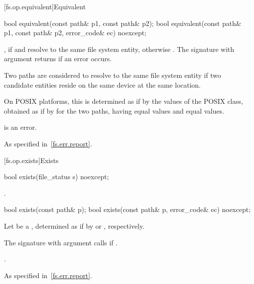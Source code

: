 [fs.op.equivalent]{Equivalent}

%
\begin{itemdecl}
bool equivalent(const path& p1, const path& p2);
bool equivalent(const path& p1, const path& p2, error_code& ec) noexcept;
\end{itemdecl}

\begin{itemdescr}
\pnum
\returns
{}, if  and  resolve to the same file
  system entity, otherwise . The signature with argument 
  returns  if an error occurs.

\pnum
Two paths are considered to resolve to the same file system entity if two
  candidate entities reside on the same device at the same location.
  \begin{note}
  On POSIX platforms, this is
  determined as if by the values of the POSIX  class,
  obtained as if by  for the two paths, having equal  values
  and equal  values.
  \end{note}

\pnum
\remarks
{} is an error.

\pnum
\throws
As specified in~\ref{fs.err.report}.
\end{itemdescr}


[fs.op.exists]{Exists}

%
\begin{itemdecl}
bool exists(file_status s) noexcept;
\end{itemdecl}

\begin{itemdescr}
\pnum
\returns
{}.
\end{itemdescr}

%
\begin{itemdecl}
bool exists(const path& p);
bool exists(const path& p, error_code& ec) noexcept;
\end{itemdecl}

\begin{itemdescr}
\pnum
Let  be a ,
determined as if by  or , respectively.

\pnum
\effects
The signature with argument  calls 
if .

\pnum
\returns
{}.

\pnum
\throws
As specified in~\ref{fs.err.report}.
\end{itemdescr}


